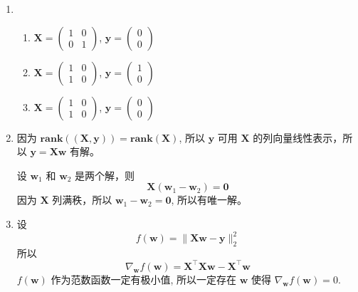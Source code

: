 \documentclass[11pt,letter,notitlepage]{article}
\newcommand{\rank}[1]{ \textbf{rank}  (#1)  }
\begin{document}
\begin{solution}
    \begin{enumerate}
        \item \begin{enumerate}
                  \item $\mathbf{X}=\begin{pmatrix}
                                1 & 0 \\ 0 & 1
                            \end{pmatrix}$, $\mathbf{y}=\begin{pmatrix}
                                0 \\ 0
                            \end{pmatrix}$
                  \item $\mathbf{X}=\begin{pmatrix}
                                1 & 0 \\ 1 & 0
                            \end{pmatrix}$, $\mathbf{y}=\begin{pmatrix}
                                1 \\ 0
                            \end{pmatrix}$
                  \item $\mathbf{X}=\begin{pmatrix}
                                1 & 0 \\ 1 & 0
                            \end{pmatrix}$, $\mathbf{y}=\begin{pmatrix}
                                0 \\ 0
                            \end{pmatrix}$
              \end{enumerate}
        \item 因为 $\rank{(\mathbf{X}, \mathbf{y})} = \rank{\mathbf{X}}$, 所以 $\mathbf{y}$ 可用 $\mathbf{X}$ 的列向量线性表示，所以 $\mathbf{y}=\mathbf{X}\mathbf{w}$ 有解。

              设 $\mathbf{w}_1$ 和 $\mathbf{w}_2$ 是两个解，则
              $$\mathbf{X}(\mathbf{w}_1-\mathbf{w}_2)=\mathbf{0}$$
              因为 $\mathbf{X}$ 列满秩，所以 $\mathbf{w}_1-\mathbf{w}_2=\mathbf{0}$, 所以有唯一解。
        \item
              设 $$f(\mathbf{w})=\|\mathbf{X}\mathbf{w}-\mathbf{y}\|_2^2$$
              所以
              $$\nabla_\mathbf{w} f(\mathbf{w})=\mathbf{X}^\top\mathbf{X}\mathbf{w}-\mathbf{X}^\top\mathbf{w}$$
              $f(\mathbf{w})$ 作为范数函数一定有极小值, 所以一定存在 $\mathbf{w}$ 使得 $\nabla_\mathbf{w} f(\mathbf{w})=0$.


\end{enumerate}
\end{solution}
\end{document}
